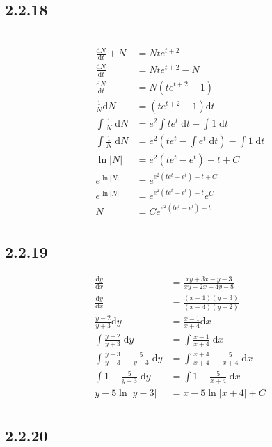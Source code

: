 \documentclass{article}
\begin{document}
\subsection{2.2.18} \
\begin{align*}
    \frac{\mathrm{d}N}{\mathrm{d}t}+N &= Nte^{t+2} \\
    \frac{\mathrm{d}N}{\mathrm{d}t} &= Nte^{t+2} -N\\
    \frac{\mathrm{d}N}{\mathrm{d}t} &= N(te^{t+2}-1)\\
    \frac{1}{N}\mathrm{d}N &= \left(te^{t+2}-1\right)\mathrm{d}t\\
    \int \frac{1}{N} \; \mathrm{d}N &= e^{2}\int te^{t} \; \mathrm{d}t-\int 1 \; \mathrm{d}t \\
    \int \frac{1}{N} \; \mathrm{d}N &= e^{2}\left(te^{t}-\int e^{t} \; \mathrm{d}t\right)-\int 1 \; \mathrm{d}t \\
   \ln |N| &= e^{2}\left(te^{t}- e^{t}\right)-t +C\\
   e^{\ln |N|}  &= e^{e^{2}\left(te^{t}- e^{t}\right)-t +C} \\
   e^{\ln |N|}  &= e^{e^{2}\left(te^{t}- e^{t}\right)-t }e^{C}\\
   N  &= Ce^{e^{2}\left(te^{t}- e^{t}\right)-t }\\
\end{align*}    

\subsection{2.2.19}
\begin{align*}
    \frac{\mathrm{d}y}{\mathrm{d}x} &= \frac{xy+3x-y-3}{xy-2x+4y-8}\\
    \frac{\mathrm{d}y}{\mathrm{d}x} &= \frac{(x-1)(y+3)}{(x+4)(y-2)}\\
    \frac{y-2}{y+3}\mathrm{d}y &= \frac{x-1}{x+4}\mathrm{d}x\\
    \int\frac{y-2}{y+3}  \; \mathrm{d}y &= \int\frac{x-1}{x+4}  \; \mathrm{d}x\\
    \int \frac{y-3}{y-3}-\frac{5}{y-3} \; \mathrm{d}y &= \int \frac{x+4}{x+4}-\frac{5}{x+4} \; \mathrm{d}x\\
    \int 1-\frac{5}{y-3} \; \mathrm{d}y &= \int 1-\frac{5}{x+4} \; \mathrm{d}x\\
    y-5\ln|y-3| &= x-5\ln|x+4|+C\\
\end{align*}

\subsection{2.2.20}
\end{document}
